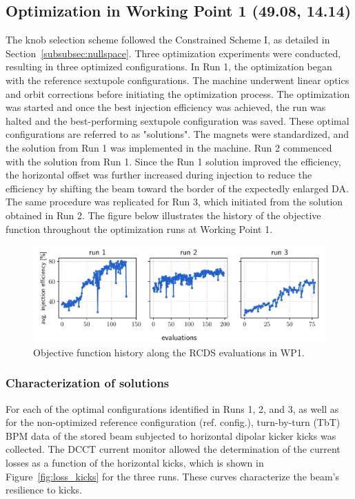 \subsection{Optimization in Working Point 1 (49.08, 14.14)}
The knob selection scheme followed the Constrained Scheme I, as detailed in Section~\ref{subsubsec:nullspace}. Three optimization experiments were conducted, resulting in three optimized configurations. In Run 1, the optimization began with the reference sextupole configurations. The machine underwent linear optics and orbit corrections before initiating the optimization process. The optimization was started and once the best injection efficiency was achieved, the run was halted and the best-performing sextupole configuration was saved. These optimal configurations are referred to as "solutions". The magnets were standardized, and the solution from Run 1 was implemented in the machine. Run 2 commenced with the solution from Run 1. Since the Run 1 solution improved the efficiency, the horizontal offset was further increased during injection to reduce the efficiency by shifting the beam toward the border of the expectedly enlarged DA. The same procedure was replicated for Run 3, which initiated from the solution obtained in Run 2. The figure below illustrates the history of the objective function throughout the optimization runs at Working Point 1.
\begin{figure}[tb]
    \centering
    \includegraphics[width=\columnwidth]{Images/wp1_objfunc_hist.pdf}
    \caption[Objective function history along the RCDS evaluations in WP1.]{Objective function history along the RCDS evaluations in WP1.}
\end{figure}
\subsubsection{Characterization of solutions}
For each of the optimal configurations identified in Runs 1, 2, and 3, as well as for the non-optimized reference configuration (ref. config.), turn-by-turn (TbT) BPM data of the stored beam subjected to horizontal dipolar kicker kicks was collected. The DCCT current monitor allowed the determination of the current losses as a function of the horizontal kicks, which is shown in Figure~\ref{fig:loss_kicks} for the three runs. These curves characterize the beam's resilience to kicks.

